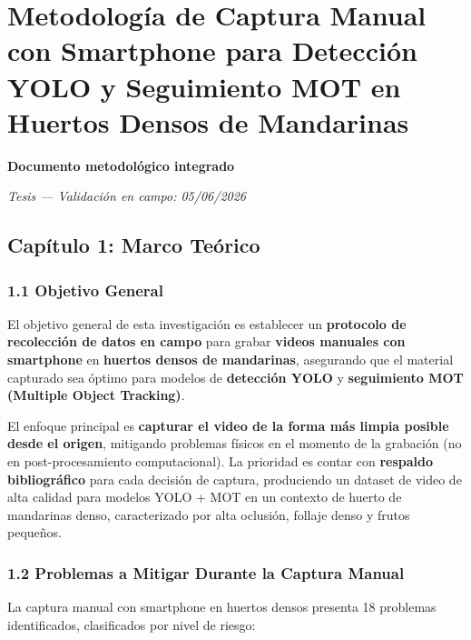 

\section{Metodología de Captura Manual con Smartphone para Detección YOLO y Seguimiento MOT en Huertos Densos de Mandarinas}


\textbf{Documento metodológico integrado}

\textit{Tesis — Validación en campo: 05/06/2026}


\hline


\subsection{Capítulo 1: Marco Teórico}


\subsubsection{1.1 Objetivo General}


El objetivo general de esta investigación es establecer un \textbf{protocolo de recolección de datos en campo} para grabar \textbf{videos manuales con smartphone} en \textbf{huertos densos de mandarinas}, asegurando que el material capturado sea óptimo para modelos de \textbf{detección YOLO} y \textbf{seguimiento MOT (Multiple Object Tracking)}.


El enfoque principal es \textbf{capturar el video de la forma más limpia posible desde el origen}, mitigando problemas físicos en el momento de la grabación (no en post-procesamiento computacional). La prioridad es contar con \textbf{respaldo bibliográfico} para cada decisión de captura, produciendo un dataset de video de alta calidad para modelos YOLO + MOT en un contexto de huerto de mandarinas denso, caracterizado por alta oclusión, follaje denso y frutos pequeños.


\subsubsection{1.2 Problemas a Mitigar Durante la Captura Manual}


La captura manual con smartphone en huertos densos presenta 18 problemas identificados, clasificados por nivel de riesgo:



